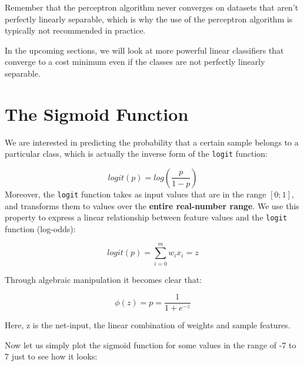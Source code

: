 \documentclass[11pt]{article}
\begin{document}
Remember that the perceptron algorithm never converges on datasets that
aren't perfectly linearly separable, which is why the use of the
perceptron algorithm is typically not recommended in practice.

In the upcoming sections, we will look at more powerful linear
classifiers that converge to a cost minimum even if the classes are not
perfectly linearly separable.

    \section{The Sigmoid Function}\label{the-sigmoid-function}

We are interested in predicting the probability that a certain sample
belongs to a particular class, which is actually the inverse form of the
\texttt{logit} function:

\[
logit(p) = log\left( \frac{p}{1 - p} \right)
\] Moreover, the \texttt{logit} function takes as input values that are
in the range \(\left[ 0; 1 \right]\), and transforms them to values over
the \textbf{entire real-number range}. We use this property to express a
linear relationship between feature values and the \texttt{logit}
function (log-odds):

\[
logit(p) = \sum\limits_{i=0}^{m}w_i x_i = z
\]

Through algebraic manipulation it becomes clear that:

\[
\phi(z) = p = \frac{1}{1 + e^{-z}}
\]

Here, z is the net-input, the linear combination of weights and sample
features.

Now let us simply plot the sigmoid function for some values in the range
of -7 to 7 just to see how it looks:
\end{document}
